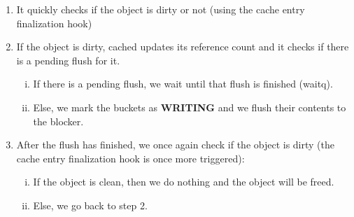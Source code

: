 \begin{enumerate}
	\item It quickly checks if the object is dirty or not (using the cache 
		entry finalization hook)
	\item If the object is dirty, cached updates its reference count and it 
		checks if there is a pending flush for it.
		\begin{enumerate}[i)]
			\item If there is a pending flush, we wait until that 
				flush is finished (waitq).
			\item Else, we mark the buckets as \textbf{WRITING} and 
				we flush their contents to the blocker.
		\end{enumerate}
	\item After the flush has finished, we once again check if the object 
		is dirty (the cache entry finalization hook is once more 
		triggered):
		\begin{enumerate}[i)]
			\item If the object is clean, then we do nothing and 
				the object will be freed.
			\item Else, we go back to step 2.		
		\end{enumerate}
\end{enumerate}

